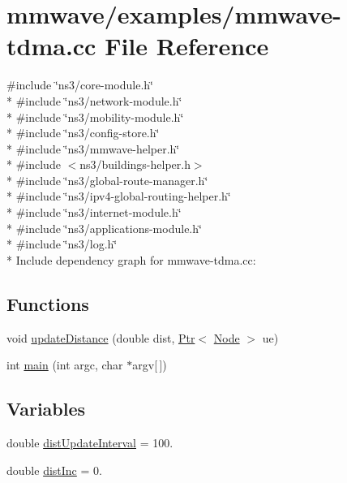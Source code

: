 \hypertarget{mmwave-tdma_8cc}{}\section{mmwave/examples/mmwave-\/tdma.cc File Reference}
\label{mmwave-tdma_8cc}
{\ttfamily \#include \char`\"{}ns3/core-\/module.\+h\char`\"{}}\\*
{\ttfamily \#include \char`\"{}ns3/network-\/module.\+h\char`\"{}}\\*
{\ttfamily \#include \char`\"{}ns3/mobility-\/module.\+h\char`\"{}}\\*
{\ttfamily \#include \char`\"{}ns3/config-\/store.\+h\char`\"{}}\\*
{\ttfamily \#include \char`\"{}ns3/mmwave-\/helper.\+h\char`\"{}}\\*
{\ttfamily \#include $<$ns3/buildings-\/helper.\+h$>$}\\*
{\ttfamily \#include \char`\"{}ns3/global-\/route-\/manager.\+h\char`\"{}}\\*
{\ttfamily \#include \char`\"{}ns3/ipv4-\/global-\/routing-\/helper.\+h\char`\"{}}\\*
{\ttfamily \#include \char`\"{}ns3/internet-\/module.\+h\char`\"{}}\\*
{\ttfamily \#include \char`\"{}ns3/applications-\/module.\+h\char`\"{}}\\*
{\ttfamily \#include \char`\"{}ns3/log.\+h\char`\"{}}\\*
Include dependency graph for mmwave-\/tdma.cc\+:
\subsection*{Functions}
\begin{DoxyCompactItemize}
\item 
void \hyperlink{mmwave-tdma_8cc_a13907b59ad3cca66e40772b111113d8e}{update\+Distance} (double dist, \hyperlink{classns3_1_1Ptr}{Ptr}$<$ \hyperlink{classns3_1_1Node}{Node} $>$ ue)
\item 
int \hyperlink{mmwave-tdma_8cc_a0ddf1224851353fc92bfbff6f499fa97}{main} (int argc, char $\ast$argv\mbox{[}$\,$\mbox{]})
\end{DoxyCompactItemize}
\subsection*{Variables}
\begin{DoxyCompactItemize}
\item 
double \hyperlink{mmwave-tdma_8cc_a5366a103b1af38305a434287c90c58b9}{dist\+Update\+Interval} = 100.
\item 
double \hyperlink{mmwave-tdma_8cc_ab6f0966775123c3c56e8b826c0a659d5}{dist\+Inc} = 0.
\end{DoxyCompactItemize}



